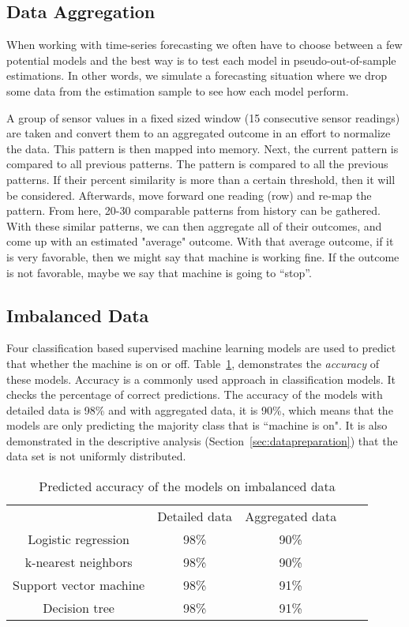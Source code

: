 \documentclass[runningheads]{llncs}
\begin{document}
\iffalse

nadeem
\fi

\subsection {Data Aggregation}
\label{sec:aggregation}

When working with time-series forecasting we often have to choose between a few potential models and the best way is to test each model in pseudo-out-of-sample estimations. In other words, we simulate a forecasting situation where we drop some data from the estimation sample to see how each model perform.

A group of sensor values in a fixed sized window (15 consecutive sensor readings) are taken and convert them to an aggregated outcome in an effort to normalize the data. This pattern is then mapped into memory. Next, the current pattern is compared to all previous patterns. The pattern is compared to all the previous patterns. If their percent similarity is more than a certain threshold, then it will be considered. Afterwards, move forward one reading (row) and re-map the pattern. From here, 20-30 comparable patterns from history can be gathered. With these similar patterns, we can then aggregate all of their outcomes, and come up with an estimated "average" outcome. With that average outcome, if it is very favorable, then we might say that machine is working fine. If the outcome is not favorable, maybe we say that machine is going to “stop”.

\subsection {Imbalanced Data}
\label{sec:imbalanced}
Four classification based supervised machine learning models are used to predict that whether the machine is on or off. Table~\ref{example3}, demonstrates the \emph{accuracy} of these models. Accuracy is a commonly used approach in classification models. It checks the percentage of correct predictions. The accuracy of the models with detailed data is 98\% and with aggregated data, it is 90\%, which means that the models are only predicting the majority class that is ``machine is on". It is also demonstrated in the descriptive analysis (Section~\ref{sec:datapreparation}) that the data set is not uniformly distributed. 

\begin{table}[ht]
\caption{Predicted accuracy of the models on imbalanced data}
\label{example3}
\centering
\begin{tabular}{ccccc}
\hline\noalign{\smallskip}
 & Detailed data & Aggregated data \\

\noalign{\smallskip}
\hline
\noalign{\smallskip}
Logistic regression     &        98\% &90\%  \\
k-nearest neighbors    &         98\% & 90\% \\
Support vector machine         &        98\% & 91\%   \\
Decision tree &        98\% & 91\%   \\
\hline
\end{tabular}
\end{table}
\end{document}
